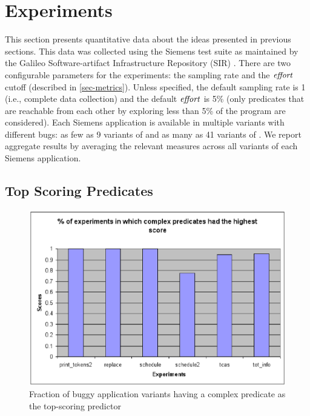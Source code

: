 
\section{Experiments}

This section presents quantitative data about the ideas presented in previous sections.  This data was collected using the Siemens test suite \cite{257766} as maintained by the Galileo Software-artifact Infrastructure Repository (SIR) \cite{Do05,SAI}.  There are two configurable parameters for the experiments: the sampling rate and the $\mathit{effort}$ cutoff (described in \autoref{sec-metrics}).  Unless specified, the default sampling rate is 1 (i.e., complete data collection) and the default $\mathit{effort}$ is 5\% (only predicates that are reachable from each other by exploring less than 5\% of the program are considered).  Each Siemens application is available in multiple variants with different bugs: as few as 9 variants of  and as many as 41 variants of .  We report aggregate results by averaging the relevant measures across all variants of each Siemens application.

\subsection{Top Scoring Predicates}

\label{sec-quant}
\begin{figure}
  \centering
  \includegraphics{charts/top-pred}
  \caption{Fraction of buggy application variants having a complex predicate as the top-scoring predictor}
  \label{fig-top-pred}
\end{figure}


